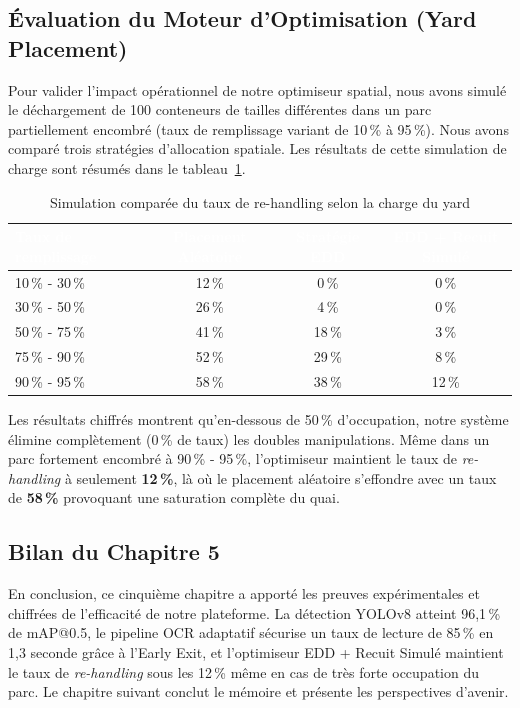 \documentclass[12pt,a4paper]{article}
\begin{document}
\subsection{Évaluation du Moteur d'Optimisation (Yard Placement)}

Pour valider l'impact opérationnel de notre optimiseur spatial, nous avons simulé le déchargement de 100 conteneurs de tailles différentes dans un parc partiellement encombré (taux de remplissage variant de 10\,\% à 95\,\%). Nous avons comparé trois stratégies d'allocation spatiale. Les résultats de cette simulation de charge sont résumés dans le tableau~\ref{tab:rehandling_simulation_results}.

\begin{table}[H]
\centering
\caption{Simulation comparée du taux de re-handling selon la charge du yard}
\begin{tabular}{|l|c|c|c|}
\hline
\rowcolor{TableHeader}\textcolor{white}{\textbf{Taux de remplissage}} & \textcolor{white}{\textbf{Placement Aléatoire}} & \textcolor{white}{\textbf{Stratégie EDD}} & \textcolor{white}{\textbf{EDD + Recuit Simulé}} \\ \hline
10\,\% - 30\,\% & 12\,\% & 0\,\% & 0\,\% \\ \hline
30\,\% - 50\,\% & 26\,\% & 4\,\% & 0\,\% \\ \hline
50\,\% - 75\,\% & 41\,\% & 18\,\% & 3\,\% \\ \hline
75\,\% - 90\,\% & 52\,\% & 29\,\% & 8\,\% \\ \hline
90\,\% - 95\,\% & 58\,\% & 38\,\% & 12\,\% \\ \hline
\end{tabular}
\label{tab:rehandling_simulation_results}
\end{table}

Les résultats chiffrés montrent qu'en-dessous de 50\,\% d'occupation, notre système élimine complètement (0\,\% de taux) les doubles manipulations. Même dans un parc fortement encombré à 90\,\% - 95\,\%, l'optimiseur maintient le taux de \textit{re-handling} à seulement \textbf{12\,\%}, là où le placement aléatoire s'effondre avec un taux de \textbf{58\,\%} provoquant une saturation complète du quai.

\subsection{Bilan du Chapitre 5}
En conclusion, ce cinquième chapitre a apporté les preuves expérimentales et chiffrées de l'efficacité de notre plateforme. La détection YOLOv8 atteint 96,1\,\% de mAP@0.5, le pipeline OCR adaptatif sécurise un taux de lecture de 85\,\% en 1,3 seconde grâce à l'Early Exit, et l'optimiseur EDD + Recuit Simulé maintient le taux de \textit{re-handling} sous les 12\,\% même en cas de très forte occupation du parc. Le chapitre suivant conclut le mémoire et présente les perspectives d'avenir.
\end{document}
